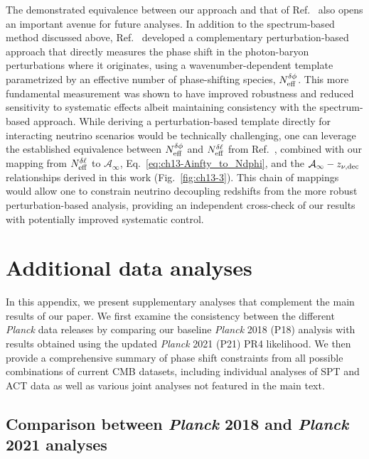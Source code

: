 \begin{subappendices}
The demonstrated equivalence between our approach and that of Ref.~\cite{Montefalcone:2025unv} also opens an important avenue for future analyses. In addition to the spectrum-based method discussed above, Ref.~\cite{Montefalcone:2025unv} developed a complementary perturbation-based approach that directly measures the phase shift in the photon-baryon perturbations where it originates, using a wavenumber-dependent template parametrized by an effective number of phase-shifting species, $N_{\rm eff}^{\delta\phi}$. This more fundamental measurement was shown to have improved robustness and reduced sensitivity to systematic effects albeit maintaining consistency with the spectrum-based approach. While deriving a perturbation-based template directly for interacting neutrino scenarios would be technically challenging, one can leverage the established equivalence between $N_{\rm eff}^{\delta\phi}$ and $N_{\rm eff}^{\delta\ell}$ from Ref.~\cite{Montefalcone:2025unv}, combined with our mapping from $N_{\rm eff}^{\delta\ell}$ to $\mathcal{A}_\infty$, Eq.~\eqref{eq:ch13-Ainfty_to_Ndphi},
and the $\mathcal{A}_\infty - z_{\nu,\rm dec}$ relationships derived in this work (Fig.~\ref{fig:ch13-3}). This chain of mappings would allow one to constrain neutrino decoupling redshifts from the more robust perturbation-based analysis, providing an independent cross-check of our results with potentially improved systematic control.

\section{Additional data analyses}\label{sec:ch13-A4}

\noindent In this appendix, we present supplementary analyses that complement the main results of our paper. We first examine the consistency between the different {\it Planck} data releases by comparing our baseline {\it Planck} 2018 (P18) analysis with results obtained using the updated {\it Planck} 2021 (P21) PR4 likelihood. We then provide a comprehensive summary of phase shift constraints from all possible combinations of current CMB datasets, including individual analyses of SPT and ACT data as well as various joint analyses not featured in the main text.

\subsection{Comparison between {\it Planck} 2018 and {\it Planck} 2021 analyses}



\end{subappendices}
